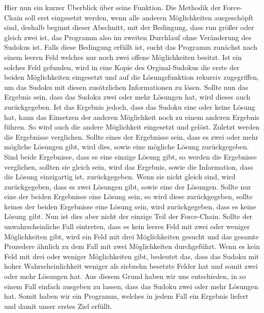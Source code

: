 \documentclass[11pt,a4paper]{article}
\begin{document}
Hier nun ein kurzer Überblick über seine Funktion.
Die Methodik der Force-Chain soll erst eingesetzt werden, wenn alle anderen Möglichkeiten ausgeschöpft sind, deshalb beginnt dieser Abschnitt, mit der Bedingung, dass run größer oder gleich zwei ist, das Programm also im zweiten Durchlauf ohne Veränderung des Sudokus ist. Falls diese Bedingung erfüllt ist, sucht das Programm zunächst nach einem leeren Feld welches nur noch zwei offene Möglichkeiten besitzt. Ist ein solches Feld gefunden, wird in eine Kopie des Orginal-Sudokus die erste der beiden Möglichkeiten eingesetzt und auf die Lösungsfunktion rekursiv zugegriffen, um das Sudoku mit diesen zusätzlichen Informationen zu lösen. Sollte nun das Ergebnis sein, dass das Sudoku zwei oder mehr Lösungen hat, wird dieses auch zurückgegeben. Ist das Ergebnis jedoch, dass das Sudoku eine oder keine Lösung hat, kann das Einsetzen der anderen Möglichkeit noch zu einem anderen Ergebnis führen. So wird auch die andere Möglichkeit eingesetzt und gelöst. Zuletzt werden die Ergebnisse verglichen. Sollte eines der Ergebnisse sein, dass es zwei oder mehr mögliche Lösungen gibt, wird dies, sowie eine mögliche Lösung zurückgegeben.
Sind beide Ergebnisse, dass es eine einzige Lösung gibt, so werden die Ergebnisse verglichen, sollten sie gleich sein, wird das Ergebnis, sowie die Information, dass die Lösung einzigartig ist, zurückgegeben. Wenn sie nicht gleich sind, wird zurückgegeben, dass es zwei Lösungen gibt, sowie eine der Lösungen. Sollte nur eine der beiden Ergebnisse eine Lösung sein, so wird diese zurückgegeben, sollte keines der beiden Ergebnisse eine Lösung sein, wird zurückgegeben, dass es keine Lösung gibt. Nun ist dies aber nicht der einzige Teil der Force-Chain.
Sollte der unwahrscheinliche Fall eintreten, dass es kein leeres Feld mit zwei oder weniger Möglichkeiten gibt, wird ein Feld mit drei Möglichkeiten gesucht und das gesamte Prozedere ähnlich zu dem Fall mit zwei Möglichkeiten durchgeführt. Wenn es kein Feld mit drei oder weniger Möglichkeiten gibt, bedeutet das, dass das Sudoku mit hoher Wahrscheinlichkeit weniger als siebzehn besetzte Felder hat und somit zwei oder mehr Lösungen hat. Aus diesem Grund haben wir uns entschieden, in so einem Fall einfach ausgeben zu lassen, dass das Sudoku zwei oder mehr Lösungen hat. Somit haben wir ein Programm, welches in jedem Fall ein Ergebnis liefert und damit unser erstes Ziel erfüllt.

\newpage
\end{document}
